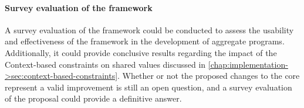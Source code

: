 \paragraph{Survey evaluation of the framework} A survey evaluation of the framework could be conducted to assess the usability and effectiveness of the framework in the development of aggregate programs.
%
Additionally, it could provide conclusive results regarding the impact of the Context-based constraints on shared values discussed in \cref{chap:implementation->sec:context-based-constraints}.
%
Whether or not the proposed changes to the core represent a valid improvement is still an open question, and a survey evaluation of the proposal could provide a definitive answer.

